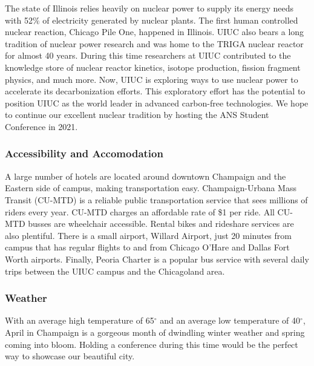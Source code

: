 The state of Illinois relies heavily on nuclear power to supply its energy needs with 52$\%$ of electricity generated by nuclear plants. The first human controlled nuclear reaction, Chicago Pile One, happened in Illinois. UIUC also bears a long tradition of nuclear power research and was home to the TRIGA nuclear reactor for almost 40 years. During this time researchers at UIUC contributed to the knowledge store of nuclear reactor kinetics, isotope production, fission fragment physics, and much more. Now, UIUC is exploring ways to use nuclear power to accelerate its decarbonization efforts. This exploratory effort has the potential to position UIUC as the world leader in advanced carbon-free technologies. We hope to continue our excellent nuclear tradition by hosting the ANS Student Conference in 2021. 
\clearpage

\subsubsection{Accessibility and Accomodation}
 A large number of hotels are located around downtown Champaign and the Eastern side of campus, making transportation easy. Champaign-Urbana Mass Transit (CU-MTD) is a reliable public transportation service that sees millions of riders every year. CU-MTD charges an affordable rate of \$1 per ride. All CU-MTD busses are wheelchair accessible. Rental bikes and rideshare services are also plentiful. There is a small airport, Willard Airport, just 20 minutes from campus that has regular flights to and from Chicago O’Hare and Dallas Fort Worth airports. Finally, Peoria Charter is a popular bus service with several daily trips between the UIUC campus and the Chicagoland area.

\subsubsection{Weather}
With an average high temperature of 65$^{\circ}$ and an average low temperature of 40$^{\circ}$, April in Champaign is a gorgeous month of dwindling winter weather and spring coming into bloom. Holding a conference during this time would be the perfect way to showcase our beautiful city.

